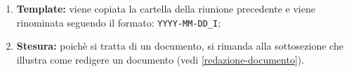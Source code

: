 \begin{itemize}
\begin{enumerate}
		      \item \textbf{Template:} viene copiata la cartella della
		            riunione precedente e viene rinominata seguendo il formato:
		            \texttt{YYYY-MM-DD\_I};

		      \item \textbf{Stesura:} poichè si tratta di un documento, si
		            rimanda alla sottosezione che illustra come redigere un
		            documento (vedi \autoref{redazione-documento}).
	      \end{enumerate}
\end{itemize}
